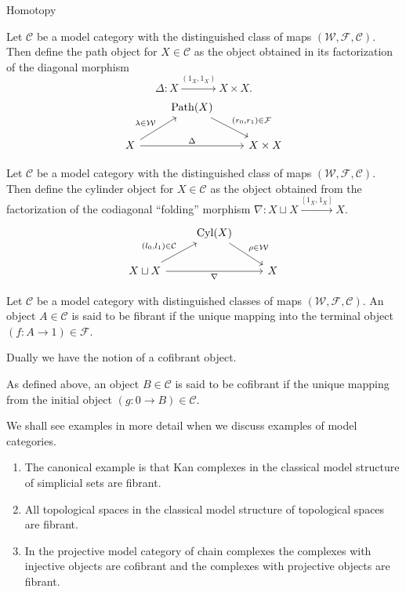 \documentclass[10pt]{beamer}
\begin{document}
\begin{frame}{Homotopy}
	
	\begin{definition}
		Let $\mathcal{C}$ be a model category with the distinguished class of maps $(\mathcal{W,F,C})$. Then define the path object for $X \in \mathcal{C}$ as the object obtained in its factorization of the diagonal morphism $$\Delta: X \xrightarrow{(1_X,1_X)} X \times X.$$
		\[\begin{tikzcd}
			& {\mathrm{Path}(X)} \\
			X && {X\times X}
			\arrow["{(r_0,r_1) \in \mathcal{F}}", from=1-2, to=2-3]
			\arrow["{\lambda \in \mathcal{W}}", from=2-1, to=1-2]
			\arrow["{\Delta}", from=2-1, to=2-3]
		\end{tikzcd}\]
	\end{definition}
	\framebreak
	\begin{definition}
		Let $\mathcal{C}$ be a model category with the distinguished class of maps $(\mathcal{W,F,C})$. Then define the cylinder object for $X \in \mathcal{C}$ as the object obtained from the factorization of the codiagonal ``folding'' morphism $\nabla: X \sqcup X \xrightarrow{[1_X,1_X]} X$.
		\[\begin{tikzcd}
			& {\mathrm{Cyl}(X)} \\
			{X\sqcup X} && X
			\arrow["{\rho\in \mathcal{W}}", from=1-2, to=2-3]
			\arrow["{(l_0,l_1)\in\mathcal{C}}", from=2-1, to=1-2]
			\arrow["\nabla"', from=2-1, to=2-3]
		\end{tikzcd}\]
	\end{definition}
	\framebreak
	\begin{definition}
		Let $\mathcal{C}$ be a model category with distinguished classes of maps $(\mathcal{W,F,C})$. An object $A \in \mathcal{C}$ is said to be fibrant if the unique mapping into the terminal object $(f: A \to 1) \in \mathcal{F}$.
	\end{definition}
	Dually we have the notion of a cofibrant object.
	\begin{definition}
		As defined above, an object $B \in \mathcal{C}$ is said to be cofibrant if the unique mapping from the initial object $(g:0 \to B) \in \mathcal{C}$.
	\end{definition}
	
	
		\begin{example}
		We shall see examples in more detail when we discuss examples of model categories. 
		\begin{enumerate}
			\item The canonical example is that Kan complexes in the classical model structure of simplicial sets are fibrant. 
			\item All topological spaces in the classical model structure of topological spaces are fibrant.
			\item In the projective model category of chain complexes the complexes with injective objects are cofibrant and the complexes with projective objects are fibrant.
		\end{enumerate}
		

\end{example}
\end{frame}
\end{document}
